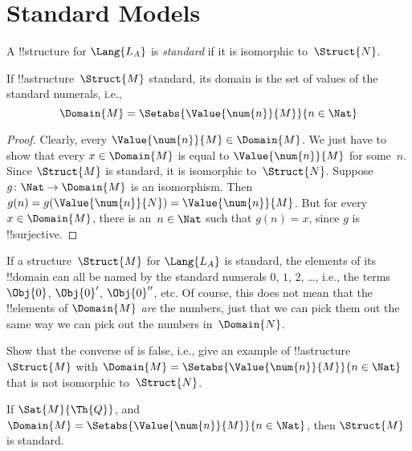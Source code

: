 \documentclass[../../../include/open-logic-section]{subfiles}
\begin{document}
\section{Standard Models}

\begin{defn}
A !!{structure} for $\Lang{L_A}$ is \emph{standard} if it is
isomorphic to~$\Struct{N}$.
\end{defn}

\begin{prop}
 If !!a{structure}~$\Struct{M}$ standard,
its domain is the set of values of the standard numerals, i.e.,
\[
\Domain{M} = \Setabs{\Value{\num{n}}{M}}{n \in \Nat}
\]
\end{prop}

\begin{proof}
Clearly, every $\Value{\num{n}}{M} \in \Domain{M}$. We just have to
show that every $x \in \Domain{M}$ is equal to $\Value{\num{n}}{M}$
for some~$n$.  Since $\Struct{M}$ is standard, it is isomorphic
to~$\Struct{N}$. Suppose $g\colon \Nat \to \Domain{M}$ is an
isomorphism. Then $g(n) = g(\Value{\num{n}}{N}) =
\Value{\num{n}}{M}$. But for every $x \in \Domain{M}$, there is an~$n
\in \Nat$ such that $g(n) = x$, since $g$ is !!{surjective}.
\end{proof}

\begin{explain}
If a structure~$\Struct{M}$ for $\Lang{L_A}$ is standard, the elements
of its !!{domain} can all be named by the standard numerals $\num{0}$,
$\num{1}$, $\num{2}$, \dots, i.e., the terms $\Obj{0}$, $\Obj{0}'$,
$\Obj{0}''$, etc. Of course, this does not mean that the !!{element}s
of $\Domain{M}$ \emph{are} the numbers, just that we can pick them out
the same way we can pick out the numbers in~$\Domain{N}$.
\end{explain}

\begin{prob}
Show that the converse of 
is false, i.e., give an example of !!a{structure}~$\Struct{M}$ with
$\Domain{M} = \Setabs{\Value{\num{n}}{M}}{n \in \Nat}$ that is not
isomorphic to~$\Struct{N}$.
\end{prob}

\begin{prop}
If $\Sat{M}{\Th{Q}}$, and $\Domain{M} = \Setabs{\Value{\num{n}}{M}}{n
  \in \Nat}$, then $\Struct{M}$ is standard.
\end{prop}
\end{document}
